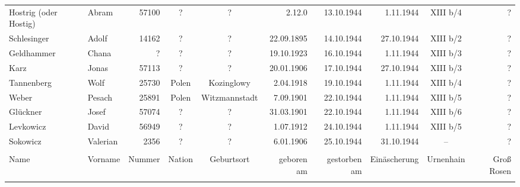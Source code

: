 \documentclass[a4paper,12pt,ngerman,
]{nisebook}
\begin{document}
\begin{tiny}
\begin{longtable}[l]{|l|l|r|c|c|r|r|r|c|r|}
Hostrig (oder Hostig)  &  Abram  & 57100 &  ?  &  ?  & 2.12.0 & 13.10.1944 & 1.11.1944 &  XIII b/4  &  ? \\[3pt] Schlesinger  &  Adolf  & 14162 &  ?  &  ?  & 22.09.1895 & 14.10.1944 & 27.10.1944 &  XIII b/2  &  ? \\[3pt]
Geldhammer  &  Chana  &  ?  &  ?  &  ?  & 19.10.1923 & 16.10.1944 & 1.11.1944 &  XIII b/3  &  ? \\[3pt]
Karz  &  Jonas  & 57113 &  ?  &  ?  & 20.01.1906 & 17.10.1944 & 27.10.1944 &  XIII b/3  &  ? \\[3pt]
Tannenberg  &  Wolf  & 25730 &  Polen  &  Kozinglowy  & 2.04.1918 & 19.10.1944 & 1.11.1944 &  XIII b/4  &  ? \\[3pt]
Weber  &  Pesach  & 25891 &  Polen  &  Witzmannstadt  & 7.09.1901 & 22.10.1944 & 1.11.1944 &  XIII b/5  &  ? \\[3pt]
Glückner  &  Josef  & 57074 &  ?  &  ?  & 31.03.1901 & 22.10.1944 & 1.11.1944 &  XIII b/6  &  ? \\[3pt]
Levkowicz  &  David  & 56949 &  ?  &  ?  & 1.07.1912 & 24.10.1944 & 1.11.1944 &  XIII b/5  &  ? \\[3pt]
Sokowicz  &  Valerian  & 2356 &  ?  &  ?  & 6.01.1906 & 25.10.1944 & 31.10.1944 &  --  &  ? \\[3pt]

\hline\pagebreak\hline  & \\[-9pt]
Name  &  Vorname  &  Nummer  &  Nation  &  Geburtsort  &  geboren am  &  gestorben am  &  Einäscherung  &  Urnenhain  &  Groß Rosen \\[3pt]
\hline  & \\[-9pt]


\end{longtable}
\end{tiny}
\end{document}
